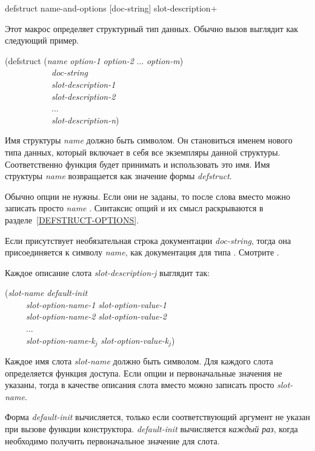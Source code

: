 \begin{defmac}
defstruct name-and-options [doc-string] {slot-description}+

Этот макрос определяет структурный тип данных.
Обычно вызов  выглядит как следующий пример.
\begin{lisp}
(defstruct (\emph{name} \emph{option-1} \emph{option-2} ... \emph{option-m}) \\
~~~~~~~~~~~\emph{doc-string} \\
~~~~~~~~~~~\emph{slot-description-1} \\
~~~~~~~~~~~\emph{slot-description-2} \\
~~~~~~~~~~~... \\
~~~~~~~~~~~\emph{slot-description-n}) \\
\end{lisp}
Имя структуры \emph{name} должно быть символом. Он становиться именем нового типа данных,
который включает в себя все экземпляры данной структуры.
Соответственно функция  будет принимать и использовать это
имя. Имя структуры \emph{name} возвращается как значение формы \emph{defstruct}.

Обычно опции не нужны. Если они не заданы, то после слова  вместо
 можно записать просто \emph{name} . Синтаксис опций и их
смысл раскрываются в разделе~\ref{DEFSTRUCT-OPTIONS}.

Если присутствует необязательная строка документации \emph{doc-string}, тогда
она присоединяется к символу \emph{name}, как документация для типа
. Смотрите .

Каждое описание слота \emph{slot-description-j} выглядит так:
\begin{lisp}
(\emph{slot-name} \emph{default-init} \\
~~~~~\emph{slot-option-name-1} \emph{slot-option-value-1} \\
~~~~~\emph{slot-option-name-2} \emph{slot-option-value-2} \\
~~~~~... \\
~~~~~\emph{slot-option-name-k${}_{j}$} \emph{slot-option-value-k${}_{j}$})
\end{lisp}
Каждое имя слота \emph{slot-name} должно быть символом. Для каждого слота
определяется функция доступа. Если опции и первоначальные значения не указаны,
тогда в качестве описания слота вместо  можно записать просто
\emph{slot-name}.

Форма \emph{default-init} вычисляется, только если соответствующий аргумент не
указан при вызове функции конструктора.
\emph{default-init} вычисляется \emph{каждый раз}, когда необходимо получить
первоначальное значение для слота.


\end{defmac}
